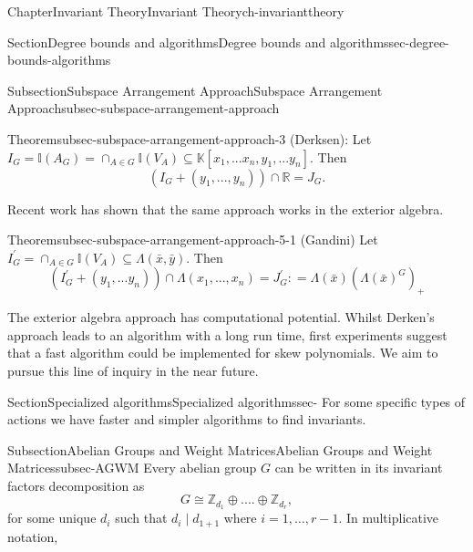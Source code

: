 \documentclass[oneside,10pt,]{book}
\newcommand{\R}{\mathbb R}
\begin{document}
\begin{chapterptx}{Chapter}{Invariant Theory}{}{Invariant Theory}{}{}{ch-invarianttheory}
\begin{sectionptx}{Section}{Degree bounds and algorithms}{}{Degree bounds and algorithms}{}{}{sec-degree-bounds-algorithms}
\begin{subsectionptx}{Subsection}{Subspace Arrangement Approach}{}{Subspace Arrangement Approach}{}{}{subsec-subspace-arrangement-approach}
\begin{theorem}{Theorem}{}{}{subsec-subspace-arrangement-approach-3}%
(Derksen): Let \(I_G = \mathbb{I}(A_G) = \cap_{A\in G}\mathbb{I}(V_A) \subseteq \mathbb{K}[x_1,...x_n,y_1,...y_n].\) Then%
\begin{equation*}
(I_G +(y_1,...,y_n)) \cap \R = J_G.
\end{equation*}
%
\end{theorem}
Recent work has shown that the same approach works in the exterior algebra.%
\par
\begin{theorem}{Theorem}{}{}{subsec-subspace-arrangement-approach-5-1}%
(Gandini) Let \(I_G^{'} = \cap_{A\in G} \mathbb{I}(V_A) \subseteq \Lambda(\bar x, \bar y)\). Then%
\begin{equation*}
(I_G^{'} +(y_1,...y_n)) \cap \Lambda(x_1,...,x_n) = J_G^{'} : = \Lambda(\bar x)(\Lambda(\bar x)^G)_+
\end{equation*}
%
\end{theorem}
%
\par
The exterior algebra approach has computational potential. Whilst Derken's approach leads to an algorithm with a long run time, first experiments suggest that a fast algorithm could be implemented for skew polynomials. We aim to pursue this line of inquiry in the near future.%
\end{subsectionptx}
\end{sectionptx}
%
%
\typeout{************************************************}
\typeout{************************************************}
%
\begin{sectionptx}{Section}{Specialized algorithms}{}{Specialized algorithms}{}{}{sec-}
For some specific types of actions we have faster and simpler algorithms to find invariants.%
%
%
\typeout{************************************************}
\typeout{************************************************}
%
\begin{subsectionptx}{Subsection}{Abelian Groups and Weight Matrices}{}{Abelian Groups and Weight Matrices}{}{}{subsec-AGWM}
Every abelian group \(G\) can be written in its invariant factors decomposition as%
\begin{equation*}
G \cong \mathbb{Z}_{d_1} \oplus....\oplus \mathbb{Z}_{d_r}, 
\end{equation*}
for some unique \(d_i\) such that \(d_i \mid d_{1+1}\) where \(i=1, \ldots , r-1\). In multiplicative notation,%
\begin{equation*}

\end{equation*}
\end{subsectionptx}
\end{sectionptx}
\end{chapterptx}
\end{document}
